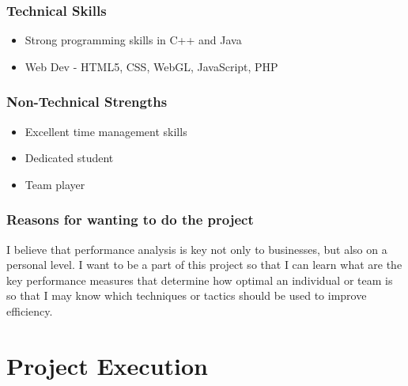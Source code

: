 \documentclass[a4paper,12pt]{article}
\begin{document}
\subsubsection{Technical Skills}
\begin{itemize}
    \item Strong programming skills in C++ and Java
    \item Web Dev - HTML5, CSS, WebGL, JavaScript, PHP
\end{itemize}
\subsubsection{Non-Technical Strengths}
\begin{itemize}
    \item Excellent time management skills
    \item Dedicated student
    \item Team player
\end{itemize}
\subsubsection{Reasons for wanting to do the project}
I believe that performance analysis is key not only to businesses, but also on a personal level. I want to be a part of this project so that I can learn what are the key performance measures that determine how optimal an 
individual or team is so that I may know which techniques or tactics should be used to improve efficiency.
\newpage
\section{Project Execution}
\end{document}
